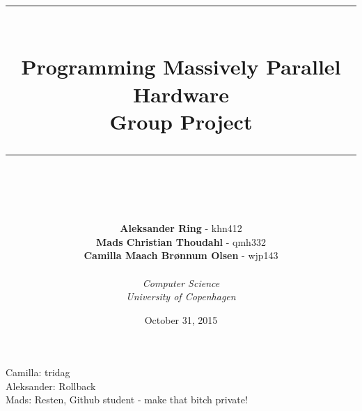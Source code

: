 \documentclass[11pt]{article}
\newcommand{\HRule}{\rule{\linewidth}{0.5mm}}
\begin{document}
\begin{titlepage}
\title{\HRule \\[0.4cm]
\textbf{Programming Massively Parallel Hardware}\\Group Project\\
\HRule \\[0.4cm]}
\author{\textbf{Aleksander Ring} - khn412\\
\textbf{Mads Christian Thoudahl} - qmh332\\
\textbf{Camilla Maach Brønnum Olsen} - wjp143\\\\
\textit{Computer Science}\\
\textit{University of Copenhagen}}
\date{October 31, 2015}
\maketitle
\thispagestyle{empty}
\end{titlepage}
\noindent Camilla: tridag\\
Aleksander: Rollback\\
Mads: Resten, Github student - make that bitch private!
\end{document}
